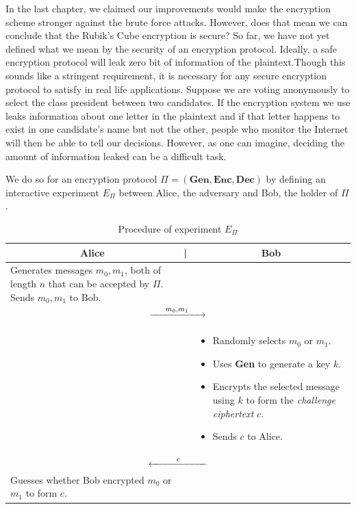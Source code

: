 In the last chapter, we claimed our improvements would make the encryption scheme stronger against the brute force attacks. However, does that mean we can conclude that the Rubik's Cube encryption is secure? So far, we have not yet defined what we mean by the security of an encryption protocol. Ideally, a safe encryption protocol will leak zero bit of information of the plaintext.Though this sounds like a stringent requirement, it is necessary for any secure encryption protocol to satisfy in real life applications. Suppose we are voting anonymously to select the class president between two candidates. If the encryption system we use leaks information about one letter in the plaintext and if that letter happens to exist in one candidate's name but not the other, people who monitor the Internet will then be able to tell our decisions. However, as one can imagine, deciding the amount of information leaked can be a difficult task.
\par We do so for an encryption protocol $\Pi = (\textbf{Gen}, \textbf{Enc}, \textbf{Dec})$ by defining an interactive experiment $E_{\Pi}$ between Alice, the adversary and Bob, the holder of $\Pi$.
\begin{table}[ht]
    \centering
    \begin{tabular}{|p{6.5cm}p{0.5cm}p{6.5cm}|}
        \hline \multicolumn{1}{|c}{Alice} & \multicolumn{1}{c}{|} & \multicolumn{1}{c|}{Bob} \\ \hline
        \hline Generates messages $m_0, m_1$, both of length $n$ that can be accepted by $\Pi$. Sends $m_0, m_1$ to Bob. & & \\
        \multicolumn{3}{|c|}{$\xrightarrow{\hspace{0.5cm} m_0, m_1 \hspace{0.5cm}}$} \\
        & & 
        \begin{itemize}
            \item Randomly selects $m_0$ or $m_1$.
            \item Uses \textbf{Gen} to generate a key $k$.
            \item Encrypts the selected message using $k$ to form the \textit{challenge ciphertext} $c$.
            \item Sends $c$ to Alice.
        \end{itemize} \\
        \multicolumn{3}{|c|}{$\xleftarrow{\hspace{0.9cm} c \hspace{0.9cm}}$} \\
        Guesses whether Bob encrypted $m_0$ or $m_1$ to form $c$. & & \\
        \hline
    \end{tabular}
    \caption{Procedure of experiment $E_{\Pi}$}
    \label{tab:security-experiment}
\end{table}
